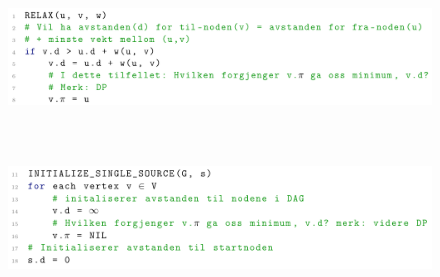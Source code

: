 \documentclass[12pt]{report}
\begin{document}

\par


\vspace{\baselineskip}



\begin{figure}[H]
	\begin{Center}
		\includegraphics[width=6.3in,height=1.43in]{./media/image192.png}
	\end{Center}
\end{figure}



\par


\vspace{\baselineskip}



\begin{figure}[H]
	\begin{Center}
		\includegraphics[width=6.3in,height=1.53in]{./media/image193.png}
	\end{Center}
\end{figure}






\newpage
\par
\end{document}
